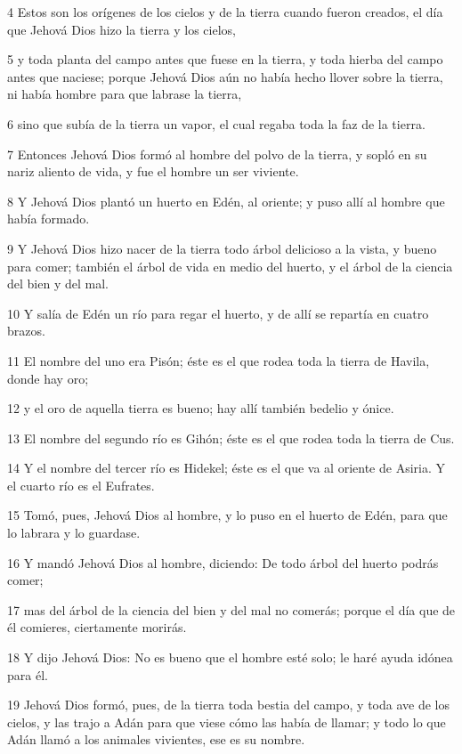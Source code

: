 \par 4 Estos son los orígenes de los cielos y de la tierra cuando fueron creados, el día que Jehová Dios hizo la tierra y los cielos,
\par 5 y toda planta del campo antes que fuese en la tierra, y toda hierba del campo antes que naciese; porque Jehová Dios aún no había hecho llover sobre la tierra, ni había hombre para que labrase la tierra,
\par 6 sino que subía de la tierra un vapor, el cual regaba toda la faz de la tierra.
\par 7 Entonces Jehová Dios formó al hombre del polvo de la tierra, y sopló en su nariz aliento de vida, y fue el hombre un ser viviente.
\par 8 Y Jehová Dios plantó un huerto en Edén, al oriente; y puso allí al hombre que había formado.
\par 9 Y Jehová Dios hizo nacer de la tierra todo árbol delicioso a la vista, y bueno para comer; también el árbol de vida en medio del huerto, y el árbol de la ciencia del bien y del mal.
\par 10 Y salía de Edén un río para regar el huerto, y de allí se repartía en cuatro brazos.
\par 11 El nombre del uno era Pisón; éste es el que rodea toda la tierra de Havila, donde hay oro;
\par 12 y el oro de aquella tierra es bueno; hay allí también bedelio y ónice.
\par 13 El nombre del segundo río es Gihón; éste es el que rodea toda la tierra de Cus.
\par 14 Y el nombre del tercer río es Hidekel; éste es el que va al oriente de Asiria. Y el cuarto río es el Eufrates.
\par 15 Tomó, pues, Jehová Dios al hombre, y lo puso en el huerto de Edén, para que lo labrara y lo guardase.
\par 16 Y mandó Jehová Dios al hombre, diciendo: De todo árbol del huerto podrás comer;
\par 17 mas del árbol de la ciencia del bien y del mal no comerás; porque el día que de él comieres, ciertamente morirás.
\par 18 Y dijo Jehová Dios: No es bueno que el hombre esté solo; le haré ayuda idónea para él.
\par 19 Jehová Dios formó, pues, de la tierra toda bestia del campo, y toda ave de los cielos, y las trajo a Adán para que viese cómo las había de llamar; y todo lo que Adán llamó a los animales vivientes, ese es su nombre.
